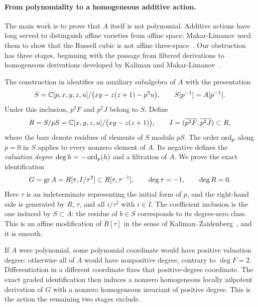 \paragraph{From polynomiality to a homogeneous additive action.}
The main work is to prove that $A$ itself is not polynomial.
Additive actions have long served to distinguish affine varieties from
affine space: Makar-Limanov used them to show that the Russell cubic is
not affine three-space~\cite{MakarLimanov}. Our obstruction has three
stages, beginning with the passage from filtered derivations to
homogeneous derivations developed by Kaliman and
Makar-Limanov~\cite[Sections~3--5]{KalimanMakarLimanov}.

The construction in  identifies
an auxiliary subalgebra of $A$ with the presentation
\[
 S=\mathbb C[p,x,y,z,u]/\bigl(xy-z(z+1)-p^3u\bigr),
 \qquad S[p^{-1}]=A[p^{-1}].
\]
Under this inclusion, $p^2F$ and $p^2J$ belong to $S$. Define
\[
 R=S/pS=\mathbb C[x,y,z,u]/\bigl(xy-z(z+1)\bigr),\qquad
 I=(\overline{p^2F},\overline{p^2J})\subset R,
\]
where the bars denote residues of elements of $S$ modulo $pS$.
The order $\operatorname{ord}_p$ along $p=0$ in $S$ applies to every nonzero
element of $A$. Its negative defines the \emph{valuation degree}
$\deg h=-\operatorname{ord}_p(h)$ and a filtration of $A$. We prove the exact
identification
\[
 G=\operatorname{gr} A=R[\tau,I/\tau^2]\subset R[\tau,\tau^{-1}],
 \qquad \deg\tau=-1,\qquad \deg R=0.
\]
Here $\tau$ is an indeterminate representing the initial form of $p$,
and the right-hand side is generated by $R$, $\tau$, and all
$i/\tau^2$ with $i\in I$. The coefficient inclusion is the one induced
by $S\subset A$: the residue of $b\in S$ corresponds to its
degree-zero class. This is an affine modification of $R[\tau]$ in
the sense of Kaliman--Zaidenberg~\cite{KalimanZaidenberg}, and it is
smooth.

If $A$ were polynomial, some polynomial coordinate would have positive
valuation degree: otherwise all of $A$ would have nonpositive degree,
contrary to $\deg F=2$. Differentiation in a different coordinate fixes
that positive-degree coordinate. The exact graded identification then
induces a nonzero homogeneous locally nilpotent derivation of $G$ with
a nonzero homogeneous invariant of positive degree. This is the action
the remaining two stages exclude.


